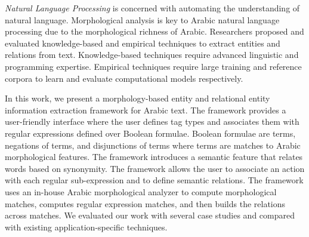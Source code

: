 \vspace{0.5cm} {\em Natural Language Processing} is concerned with automating the understanding of natural language. 
Morphological analysis is key to Arabic natural language processing due to the morphological richness of Arabic.
Researchers proposed and evaluated knowledge-based and empirical techniques to extract entities and relations from text. 
Knowledge-based techniques require advanced linguistic and programming expertise. 
Empirical techniques require large training and reference corpora to learn and evaluate computational models respectively.

In this work, we present a morphology-based entity and relational entity information extraction framework for Arabic text. 
The framework provides a user-friendly interface where the user defines tag types 
and associates them with regular expressions defined over Boolean formulae. 
Boolean formulae are terms, negations of terms, and disjunctions of terms where terms are matches to Arabic morphological features. 
The framework introduces a semantic feature that relates words based on synonymity. 
The framework allows the user to associate an action with each regular sub-expression and to define semantic relations. 
The framework uses an in-house Arabic morphological analyzer to compute morphological matches, computes regular expression matches, and then builds the relations across matches. 
We evaluated our work with several case studies and compared with existing application-specific techniques.